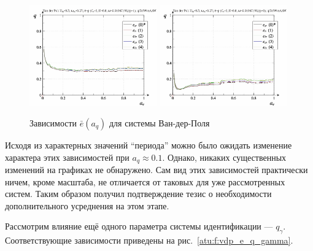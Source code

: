 \begin{figure}[ht!]
\begin{center}
  \includegraphics[width=0.49\textwidth]{p/cha/vdp/vdp_id-p_a_q_sign.png}
  \hfill
  \includegraphics[width=0.49\textwidth]{p/cha/vdp/vdp_id-p_a_q_sin.png}
\end{center}
  \caption{Зависимости $\bar{e}(a_q)$ для системы Ван-дер-Поля}
\label{atu:f:vdp_e_a_q}
\end{figure}

Исходя из характерных значений ``периода'' можно было ожидать
изменение характера этих зависимостей при $a_q \approx 0.1$.
Однако, никаких существенных изменений на графиках не обнаружено.
Сам вид этих зависимостей практически ничем, кроме масштаба,
не отличается от таковых для уже рассмотренных систем.
Таким образом получил подтверждение тезис о необходимости
дополнительного усреднения на этом этапе.

Рассмотрим влияние ещё одного параметра системы идентификации --- $q_\gamma$.
Соответствующие зависимости приведены на  рис.~\ref{atu:f:vdp_e_q_gamma}.


